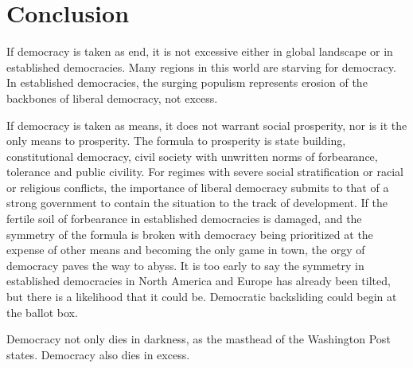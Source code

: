 \documentclass{scrartcl}
\theoremstyle{definition}
\begin{document}
\bigskip{}

\section{Conclusion}

If democracy is taken as end, it is not excessive either in global landscape or in established democracies. Many regions in this world are starving for democracy. In established democracies, the surging populism represents erosion of the backbones of liberal democracy, not excess. 

If democracy is taken as means, it does not warrant social prosperity, nor is it the only means to prosperity. The formula to prosperity is state building, constitutional democracy, civil society with unwritten norms of forbearance, tolerance and public civility. For regimes with severe social stratification or racial or religious conflicts, the importance of liberal democracy submits to that of a strong government to contain the situation to the track of development. If the fertile soil of forbearance in established democracies is damaged, and the symmetry of the formula is broken with democracy being prioritized at the expense of other means and becoming the only game in town, the orgy of democracy paves the way to abyss. It is too early to say the symmetry in established democracies in North America and Europe has already been tilted, but there is a likelihood that it could be. Democratic backsliding could begin at the ballot box. 

Democracy not only dies in darkness, as the masthead of the Washington Post states. Democracy also dies in excess. 

\printbibliography
\end{document}
